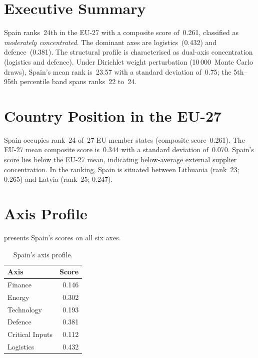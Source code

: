 \documentclass[12pt,a4paper]{article}
\begin{document}
\hypersetup{pageanchor=true}
\pagestyle{fancy}
\renewcommand{\headrulewidth}{0.4pt}


\section{Executive Summary}
\label{sec:summary}

Spain ranks~24th in the EU-27 with a composite \ISI score of~0.261, classified as \emph{moderately concentrated}.  The dominant axes are logistics~(0.432) and defence~(0.381).  The structural profile is characterised as dual-axis concentration (logistics and defence).  Under Dirichlet weight perturbation (10\,000~Monte Carlo draws), Spain's mean rank is~23.57 with a standard deviation of~0.75; the 5th--95th percentile band spans ranks~22 to~24.


\section{Country Position in the EU-27}
\label{sec:position}

Spain occupies rank~24 of~27 EU member states (composite score~0.261).  The EU-27 mean composite score is~0.344 with a standard deviation of~0.070.  Spain's score lies below the EU-27 mean, indicating below-average external supplier concentration.  In the ranking, Spain is situated between Lithuania (rank~23; 0.265) and Latvia (rank~25; 0.247).


\section{Axis Profile}
\label{sec:axis-profile}

 presents Spain's scores on all six \ISI axes.

\begin{table}[htbp]
\centering\small
\caption{Spain's \ISI axis profile.}
\label{tab:axis-profile}
\begin{tabular}{@{}lr@{}}
\toprule
\textbf{Axis} & \textbf{Score} \\
\midrule
    Finance           & 0.146 \\
    Energy            & 0.302 \\
    Technology        & 0.193 \\
    Defence           & 0.381 \\
    Critical Inputs   & 0.112 \\
    Logistics         & 0.432 \\
\bottomrule
\end{tabular}
\end{table}
\end{document}
